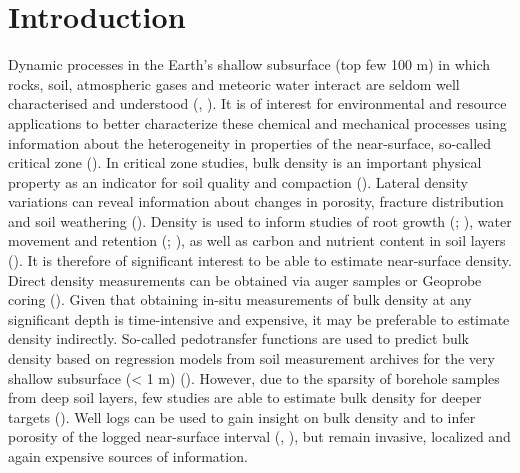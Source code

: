 \documentclass{article}
\begin{document}
	
	\newpage
	\section{Introduction}
	Dynamic processes in the Earth's shallow subsurface (top few 100 m) in which rocks, soil, atmospheric gases and meteoric water interact are seldom well characterised and understood (\cite{parsekian2015multiscale}, \cite{riebe2017controls}). It is of interest for environmental and resource applications to better characterize these chemical and mechanical processes using information about the heterogeneity in properties of the near-surface, so-called critical zone (\cite{anderson2007physical}). In critical zone studies, bulk density is an important physical property as an indicator for soil quality and compaction (\cite{suuster2011soil}). Lateral density variations can reveal information about changes in porosity, fracture distribution and soil weathering (\cite{flinchum2022p}). Density is used to inform studies of root growth (\cite{brimhall1992deformational}; \cite{dexter2004soil}), water movement and retention (\cite{huang2011soil}; \cite{flinchum2018estimating}), as well as carbon and nutrient content in soil layers (\cite{nanko2014pedotransfer}). It is therefore of significant interest to be able to estimate near-surface density.\\
	
	Direct density measurements can be obtained via auger samples or Geoprobe coring (\cite{holbrook2014geophysical}). Given that obtaining in-situ measurements of bulk density at any significant depth is time-intensive and expensive, it may be preferable to estimate density indirectly. So-called pedotransfer functions are used to predict bulk density based on regression models from soil measurement archives for the very shallow subsurface (< 1 m) (\cite{suuster2011soil}). However, due to the sparsity of borehole samples from deep soil layers, few studies are able to estimate bulk density for deeper targets (\cite{qiao2019development}). Well logs can be used to gain insight on bulk density and to infer porosity of the logged near-surface interval (\cite{FANCHI2010109}, \cite{holbrook2019links}), but remain invasive, localized and again expensive sources of information.\\
	
\end{document}
